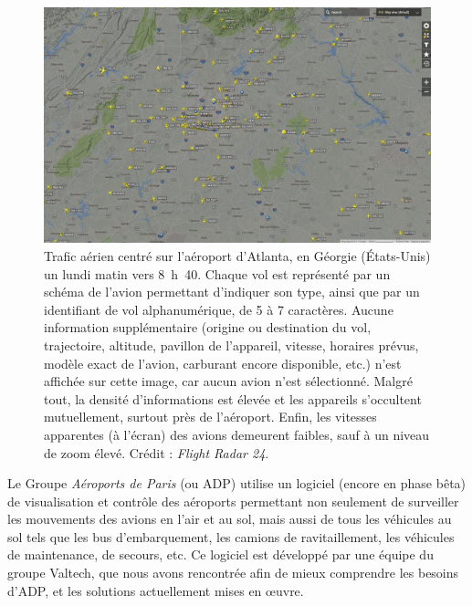 	\begin{figure}[htb]
		\centering
		\includegraphics[width=\textwidth]{figures/ch1/atlanta}
		\caption[Trafic aérien, Atlanta.]{Trafic aérien centré sur l'aéroport d'Atlanta, en Géorgie (États-Unis) un lundi matin vers 8~h~40. Chaque vol est représenté par un schéma de l'avion permettant d'indiquer son type, ainsi que par un identifiant de vol alphanumérique, de 5 à 7 caractères. Aucune information supplémentaire (origine ou destination du vol, trajectoire, altitude, pavillon de l'appareil, vitesse, horaires prévus, modèle exact de l'avion, carburant encore disponible, etc.) n'est affichée sur cette image, car aucun avion n'est sélectionné. Malgré tout, la densité d'informations est élevée et les appareils s'occultent mutuellement, surtout près de l'aéroport. Enfin, les vitesses apparentes (à l'écran) des avions demeurent faibles, sauf à un niveau de zoom élevé. Crédit : \emph{Flight Radar 24\footnotemark}.}
		\label{fig:atlanta}
	\end{figure}
	
	
	Le Groupe \emph{Aéroports de Paris} (ou ADP) utilise un logiciel (encore en phase bêta) de visualisation et contrôle des aéroports permettant non seulement de surveiller les mouvements des avions en l'air et au sol, mais aussi de tous les véhicules au sol tels que les bus d'embarquement, les camions de ravitaillement, les véhicules de maintenance, de secours, etc. Ce logiciel est développé par une équipe du groupe Valtech\footnotemark{}, que nous avons rencontrée afin de mieux comprendre les besoins d'ADP, et les solutions actuellement mises en \oe{}uvre.
	
	
